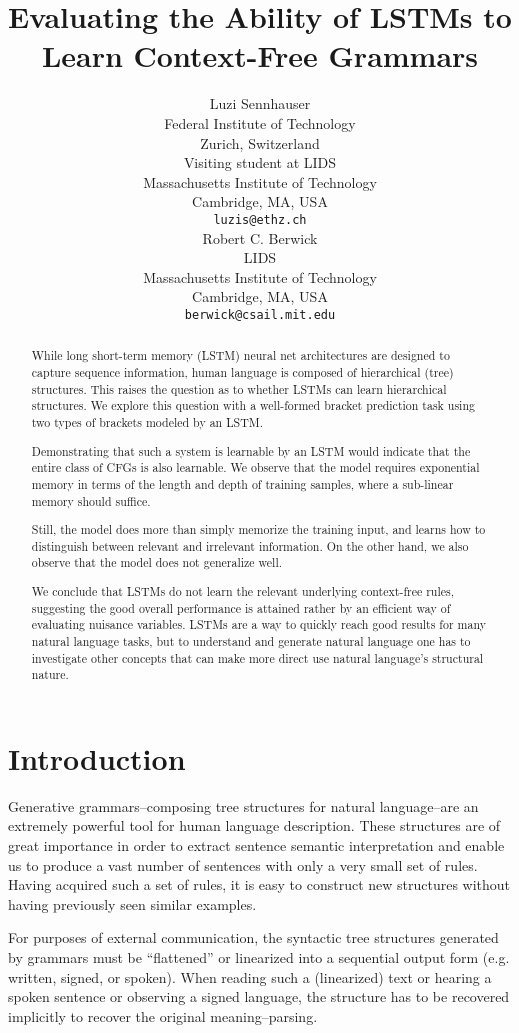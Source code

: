 \documentclass[11pt,a4paper]{article}
\title{Evaluating the Ability of LSTMs to Learn Context-Free Grammars}
\author{Luzi Sennhauser \\
  Federal Institute of Technology\\
  Zurich, Switzerland \\
  Visiting student at LIDS\\
  Massachusetts Institute of Technology\\
  Cambridge, MA, USA \\
  {\tt luzis@ethz.ch} \\\And
  Robert C. Berwick\\
  LIDS\\ 
  Massachusetts Institute of Technology \\
  Cambridge, MA, USA \\
  {\tt berwick@csail.mit.edu}
}
\date{}
\begin{document}
\maketitle
\begin{abstract}

While long short-term memory (LSTM) neural net architectures are designed to capture sequence information, human language is composed of hierarchical (tree) structures. This raises the question as to whether LSTMs can learn hierarchical structures. We explore this question with a well-formed bracket prediction task using two types of brackets modeled by an LSTM.

Demonstrating that such a system is learnable by an LSTM would indicate that the entire class of CFGs is also learnable.  We observe that the model requires exponential memory in terms of the length and depth of training samples, where a sub-linear memory should suffice.

Still, the model does more than simply memorize the training input, and learns how to distinguish between relevant and irrelevant information. On the other hand, we also observe that the model does not generalize well.

We conclude that LSTMs do not learn the relevant underlying context-free rules, suggesting the good overall performance is attained rather by an efficient way of evaluating nuisance variables. LSTMs are a way to quickly reach good results for many natural language tasks, but to understand and generate natural language one has to investigate other concepts that can make more direct use natural language's structural nature.
\end{abstract}

\section{Introduction}

Generative grammars--composing tree structures for natural language--are an extremely powerful tool for human language description.  These structures are of great importance in order to extract sentence semantic interpretation\cite{berwick2016only} and enable us to produce a vast number of sentences with only a very small set of rules. Having acquired such a set of rules, it is easy to construct new structures without having previously seen similar examples.

For purposes of external communication, the syntactic tree structures generated by grammars must be ``flattened'' or linearized into a sequential output form (e.g. written, signed, or spoken). When reading such a (linearized) text or hearing a spoken sentence or observing a signed language, the structure has to be recovered implicitly to recover the original meaning--parsing.
\end{document}
